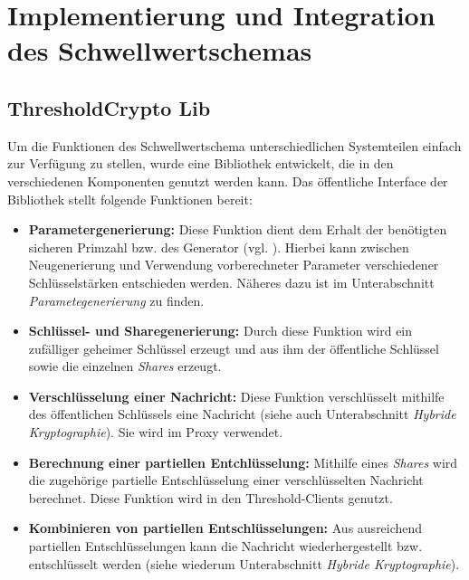 \section{Implementierung und Integration des Schwellwertschemas}

\label{sec_impl_threshold}


\subsection{ThresholdCrypto \glqq Lib\grqq{}}

%

Um die Funktionen des Schwellwertschema unterschiedlichen Systemteilen einfach zur Verfügung zu stellen, wurde eine Bibliothek entwickelt, die in den verschiedenen Komponenten genutzt werden kann. Das öffentliche Interface der Bibliothek stellt folgende Funktionen bereit:

\begin{itemize}
  \item \textbf{Parametergenerierung: } Diese Funktion dient dem Erhalt der benötigten sicheren Primzahl bzw. des Generator (vgl. ). Hierbei kann zwischen Neugenerierung und Verwendung vorberechneter Parameter verschiedener Schlüsselstärken entschieden werden. Näheres dazu ist im Unterabschnitt \textit{Parametegenerierung} zu finden.
  \item \textbf{Schlüssel- und Sharegenerierung: } Durch diese Funktion wird ein zufälliger geheimer Schlüssel erzeugt und aus ihm der öffentliche Schlüssel sowie die einzelnen \textit{Shares} erzeugt. 
  \item \textbf{Verschlüsselung einer Nachricht: } Diese Funktion verschlüsselt mithilfe des öffentlichen Schlüssels eine Nachricht (siehe auch Unterabschnitt \textit{Hybride Kryptographie}). Sie wird im Proxy verwendet.
  \item \textbf{Berechnung einer partiellen Entchlüsselung: } Mithilfe eines \textit{Shares} wird die zugehörige partielle Entschlüsselung einer verschlüsselten Nachricht berechnet. Diese Funktion wird in den Threshold-Clients genutzt.
  \item \textbf{Kombinieren von partiellen Entschlüsselungen: } Aus ausreichend partiellen Entschlüsselungen kann die Nachricht wiederhergestellt bzw. entschlüsselt werden (siehe wiederum Unterabschnitt \textit{Hybride Kryptographie}).
\end{itemize}

